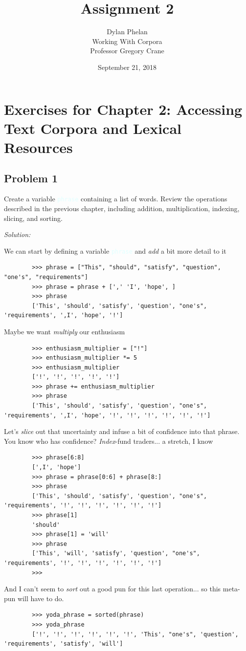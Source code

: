 \documentclass[11pt]{article}
\author{ 
	Dylan Phelan \\ 
	Working With Corpora \\ 
	Professor Gregory Crane 
}
\title{Assignment 2}
\date{September 21, 2018}
\newenvironment{solution}{
	\vspace{10px}\noindent\emph{Solution:}
}{
	\vspace{10px}
}
\newcommand{\codeword}[1]{
	\texttt{\textcolor{lightCyan}{#1}}
}
\begin{document}
\maketitle

\section*{Exercises for Chapter 2: Accessing Text Corpora and Lexical Resources}
\subsection*{Problem 1}

Create a variable \codeword{phrase} containing a list of words. Review the operations described in the previous chapter, including addition, multiplication, indexing, slicing, and sorting.

\begin{solution}
	
	We can start by defining a variable \codeword{phrase} and \emph{add} a bit more detail to it
	\begin{lstlisting}
		>>> phrase = ["This", "should", "satisfy", "question", "one's", "requirements"]
		>>> phrase = phrase + [',' 'I', 'hope', ]
		>>> phrase
        ['This', 'should', 'satisfy', 'question', "one's", 'requirements', ',I', 'hope', '!']
	\end{lstlisting}

    Maybe we want \emph{multiply} our enthusiasm 
	\begin{lstlisting}
		>>> enthusiasm_multiplier = ["!"]
		>>> enthusiasm_multiplier *= 5
		>>> enthusiasm_multiplier
		['!', '!', '!', '!', '!']
		>>> phrase += enthusiasm_multiplier
		>>> phrase
		['This', 'should', 'satisfy', 'question', "one's", 'requirements', ',I', 'hope', '!', '!', '!', '!', '!', '!']
	\end{lstlisting}

	Let's \emph{slice} out that uncertainty and infuse a bit of confidence into that phrase. You know who has confidence? \emph{Index}-fund traders... {\tiny a stretch, I know}
	\begin{lstlisting}
		>>> phrase[6:8]
		[',I', 'hope']
		>>> phrase = phrase[0:6] + phrase[8:]
		>>> phrase
		['This', 'should', 'satisfy', 'question', "one's", 'requirements', '!', '!', '!', '!', '!', '!']
		>>> phrase[1]
		'should'
		>>> phrase[1] = 'will'
		>>> phrase
		['This', 'will', 'satisfy', 'question', "one's", 'requirements', '!', '!', '!', '!', '!', '!']
		>>>
	\end{lstlisting}
	
	And I can't seem to \emph{sort} out a good pun for this last operation... so this meta-pun will have to do.
	\begin{lstlisting}
		>>> yoda_phrase = sorted(phrase)
		>>> yoda_phrase
		['!', '!', '!', '!', '!', '!', 'This', "one's", 'question', 'requirements', 'satisfy', 'will']
	\end{lstlisting}
	
\end{solution} 
\end{document}
